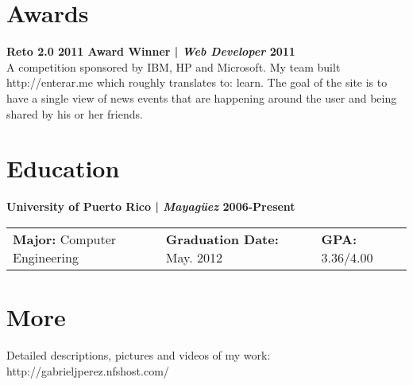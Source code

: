 \documentclass[margin,line]{res}
\begin{document}
\begin{resume}
\section{\sc Awards}

{\bf Reto 2.0 2011 Award Winner | {\em Web Developer} \hfill {\bf 2011 \\} }
\vspace{-.01cm}
A competition sponsored by IBM, HP and Microsoft. My team built http://enterar.me which roughly translates to: learn. The goal of the site is to have a single view of news events that are happening around the user and being shared by his or her friends. 





\section{\sc Education}

{\bf University of Puerto Rico | {\em Mayag\"uez } \hfill {\bf 2006-Present } }
\vspace{-.01cm}
\begin{tabular}{@{}p{2in}p{2in}p{2in}}
 {\bf Major:} Computer Engineering           & {\bf Graduation Date:} May. 2012  & {\bf GPA:} 3.36/4.00  \\            
\end{tabular}


\section{\sc More}
Detailed descriptions, pictures and videos of my work: http://gabrieljperez.nfshost.com/    \\

\end{resume}
\end{document}
